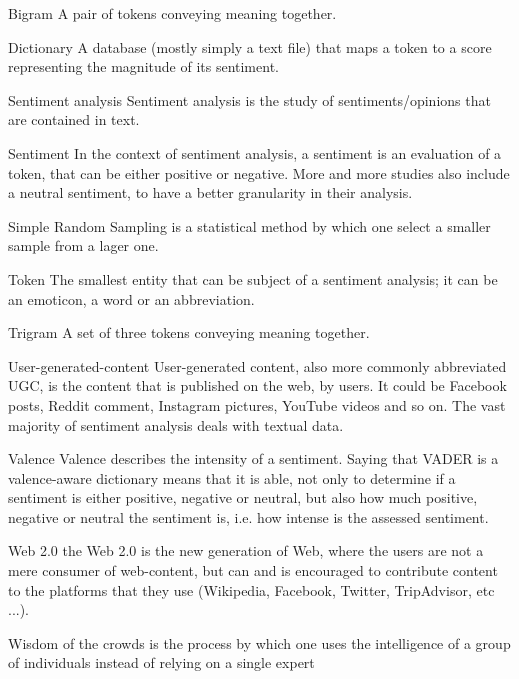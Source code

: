 	\begin{glossy}
		\item [Bigram] A pair of tokens conveying meaning together.
		\item [Dictionary] A database (mostly simply a text file) that maps a token to a score representing the magnitude of its sentiment.
		\item [Sentiment analysis] Sentiment analysis is the study of sentiments/opinions that are contained in text.
		\item[Sentiment] In the context of sentiment analysis, a sentiment is an evaluation of a token, that can be either positive or negative. More and more studies also include a neutral sentiment, to have a better granularity in their analysis.
		\item [Simple Random Sampling] is a statistical method by which one select a smaller sample from a lager one.
		\item [Token] The smallest entity that can be subject of a sentiment analysis; it can be an emoticon, a word or an abbreviation.
		\item [Trigram] A set of three tokens conveying meaning together.
		\item [User-generated-content] User-generated content, also more commonly abbreviated UGC, is the content that is published on the web, by users. It could be Facebook posts, Reddit comment, Instagram pictures, YouTube videos and so on. The vast majority of sentiment analysis deals with textual data.
		\item [Valence] Valence describes the intensity of a sentiment. Saying that VADER is a valence-aware dictionary means that it is able, not only to determine if a sentiment is either positive, negative or neutral, but also how much positive, negative or neutral the sentiment is, i.e. how intense is the assessed sentiment.
		\item [Web 2.0] the Web 2.0 is the new generation of Web, where the users are not a mere consumer of web-content, but can and is encouraged to contribute content to the platforms that they use (Wikipedia, Facebook, Twitter, TripAdvisor, etc ...).
		\item [Wisdom of the crowds] is the process by which one uses the intelligence of a group of individuals instead of relying on a single expert
	\end{glossy}
